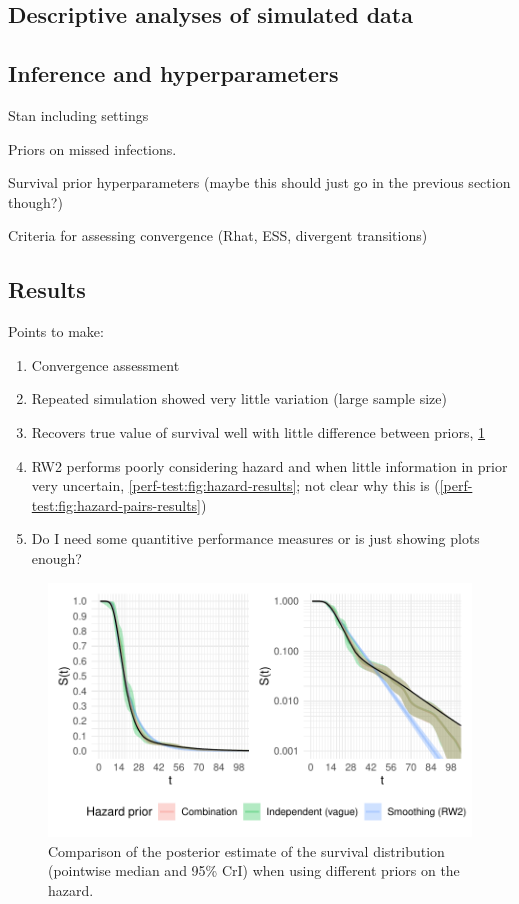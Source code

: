 \documentclass[thesis.tex]{subfiles}
\begin{document}
\subsection{Descriptive analyses of simulated data}

\subsection{Inference and hyperparameters}

Stan including settings

Priors on missed infections.

Survival prior hyperparameters (maybe this should just go in the previous section though?)

Criteria for assessing convergence (Rhat, ESS, divergent transitions)

\subsection{Results}

Points to make:

\begin{enumerate}
  \item Convergence assessment
  \item Repeated simulation showed very little variation (large sample size)
  \item Recovers true value of survival well with little difference between priors, \cref{perf-test:fig:survival-results}
  \item RW2 performs poorly considering hazard and when little information in prior very uncertain, \cref{perf-test:fig:hazard-results}; not clear why this is (\cref{perf-test:fig:hazard-pairs-results})
  \item Do I need some quantitive performance measures or is just showing plots enough?
\end{enumerate}

\begin{figure}
  \centering \includegraphics{cis-perfect-testing/survival-results}
  \caption[Comparison of survival function estimates under different priors]{Comparison of the posterior estimate of the survival distribution (pointwise median and 95\% CrI) when using different priors on the hazard. \label{perf-test:fig:survival-results}}
\end{figure}
\end{document}
